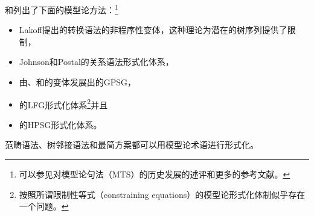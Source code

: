 \citet[--20]{PS2001a}和\citet{Pullum2007a}列出了下面的模型论方法：\footnote{%
可以参见对模型论句法（MTS）的历史发展的述评和更多的参考文献。  
}
\begin{itemize}
\item Lakoff提出的转换语法的非程序性变体，这种理论为潜在的树序列提供了限制，
\item Johnson和Postal的关系语法形式化体系\citeyearpar{JP80a-u}，
\item 由\citet{GPCKHL88a}、\citet{BGM93a-u}和\citet{Rogers97a}的变体发展出的GPSG\indexgpsgc，
\item \citet{Kaplan95a}的LFG\indexlfgc 形式化体系\footnote{%
 按照\citet[\S~3.2]{Pullum2013a}所谓限制性等式（constraining equations）的模型论形式化体制似乎存在一个问题。
}并且
\item \citet{King99a-u}的HPSG\indexhpsgc 形式化体系。
\end{itemize}
范畴语法\indexcgc\citep{BvN94a-u}、树邻接语法\indextagc\citep{RVS94a-u}和最简方案\indexmpc\citep{Veenstra98a}都可以用模型论术语进行形式化。


